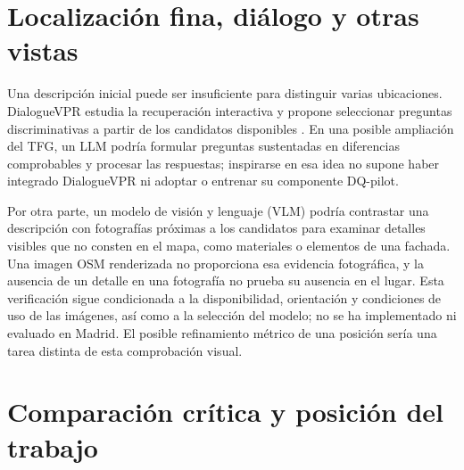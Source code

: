 \section{Localización fina, diálogo y otras vistas}
\label{sec:arte-alternativas}
Una descripción inicial puede ser insuficiente para distinguir varias ubicaciones. DialogueVPR estudia la recuperación interactiva y propone seleccionar preguntas discriminativas a partir de los candidatos disponibles \cite{song2026dialogue}. En una posible ampliación del TFG, un LLM podría formular preguntas sustentadas en diferencias comprobables y procesar las respuestas; inspirarse en esa idea no supone haber integrado DialogueVPR ni adoptar o entrenar su componente DQ-pilot.

Por otra parte, un modelo de visión y lenguaje (VLM) podría contrastar una descripción con fotografías próximas a los candidatos para examinar detalles visibles que no consten en el mapa, como materiales o elementos de una fachada. Una imagen OSM renderizada no proporciona esa evidencia fotográfica, y la ausencia de un detalle en una fotografía no prueba su ausencia en el lugar. Esta verificación sigue condicionada a la disponibilidad, orientación y condiciones de uso de las imágenes, así como a la selección del modelo; no se ha implementado ni evaluado en Madrid. El posible refinamiento métrico de una posición sería una tarea distinta de esta comprobación visual.

\section{Comparación crítica y posición del trabajo}
\label{sec:comparacion-arte}
